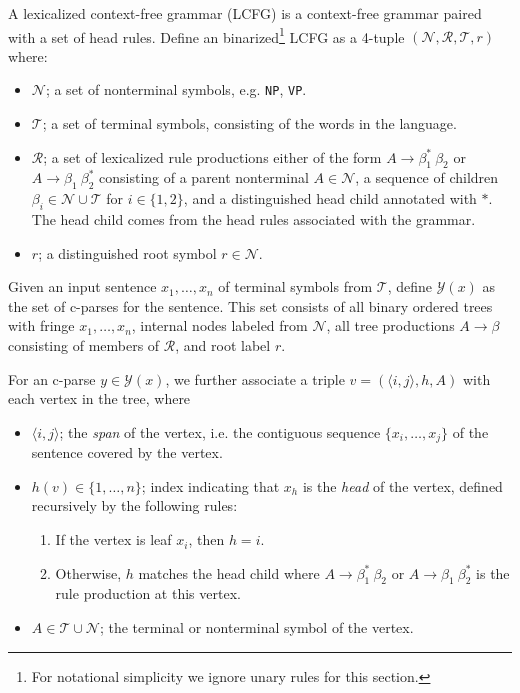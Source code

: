 \documentclass[11pt,letterpaper]{article}
\newcommand{\nonterms}{\mathcal{N}}
\newcommand{\rules}{\mathcal{R}}
\newcommand{\terms}{\mathcal{T}}
\newcommand{\Span}[1]{\langle #1 \rangle}
\newcommand{\Tag}[1]{\texttt{#1}}
\newcommand{\Root}{r}
\newcommand{\RuleA}[3]{#1 \rightarrow #2^*\ #3}
\newcommand{\RuleB}[3]{#1 \rightarrow #2\ #3^*}
\begin{document}
A lexicalized context-free grammar (LCFG) is a context-free grammar 
paired with a set of head rules. Define an binarized\footnote{For notational simplicity we ignore unary rules for this section.} LCFG as a 4-tuple $(\nonterms, \rules, \terms, \Root)$ where:
\begin{itemize}
\item $\nonterms$; a set of nonterminal symbols, e.g. \Tag{NP}, \Tag{VP}.
\item $\terms$; a set of terminal symbols, consisting of the words in the language.
\item $\rules$; a set of lexicalized rule productions either of the form $\RuleA{A}{\beta_1}{\beta_2}$ or $\RuleB{A}{\beta_1}{\beta_2}$  consisting of a parent nonterminal $A \in \nonterms$, a sequence of children $\beta_i \in \nonterms \cup \terms$ for $i \in \{1, 2\}$, and a distinguished head child annotated with $*$. The head child comes from the head rules associated with the grammar.
\item $\Root$; a distinguished root symbol $\Root \in \nonterms$.
\end{itemize}

Given an input sentence $x_1, \ldots, x_n$ of terminal symbols from $\terms$, define $\mathcal{Y}(x)$ as the set of c-parses for the sentence. This set consists of all binary ordered trees with fringe $x_1, \ldots,  x_n$, internal nodes labeled from $\nonterms$, all tree productions  $A \rightarrow \beta$ consisting of members of $\rules$, and root label $\Root$.


For an c-parse $y \in \mathcal{Y}(x)$,
we further associate a triple $v = (\Span{i, j}, h, A)$ with each vertex in the tree, where



\begin{itemize}
\item $\Span{i,j}$; the \textit{span}  of the vertex, i.e. the contiguous sequence $\{x_i, \ldots, x_j\}$ of the sentence covered by the vertex.

\item $h(v) \in \{1, \ldots, n\}$; index indicating that $x_h$ is the \textit{head} of the vertex, defined recursively by the following rules:
  \begin{enumerate}
  \item  If the vertex is leaf $x_i$, then $h=i$.
  \item Otherwise,  $h$ matches the head child where $\RuleA{A}{\beta_1}{\beta_2}$ or $\RuleB{A}{\beta_1}{\beta_2}$  is the rule production at this vertex.
  \end{enumerate}

\item $A \in \terms \cup \nonterms$; the terminal or nonterminal symbol of the vertex.
\end{itemize}
\end{document}
